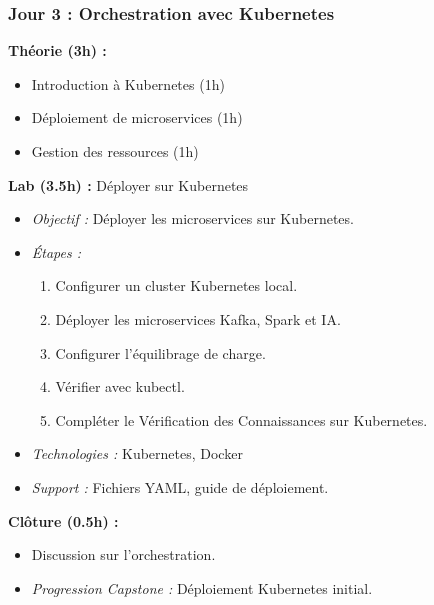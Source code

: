 \documentclass[11pt]{article}
\begin{document}
\subsubsection{Jour 3 : Orchestration avec Kubernetes}
\textbf{Théorie (3h) :}
\begin{itemize}
    \item Introduction à Kubernetes (1h)
    \item Déploiement de microservices (1h)
    \item Gestion des ressources (1h)
\end{itemize}
\textbf{Lab (3.5h) :} Déployer sur Kubernetes
\begin{itemize}
    \item \textit{Objectif :} Déployer les microservices sur Kubernetes.
    \item \textit{Étapes :}
        \begin{enumerate}
            \item Configurer un cluster Kubernetes local.
            \item Déployer les microservices Kafka, Spark et IA.
            \item Configurer l'équilibrage de charge.
            \item Vérifier avec kubectl.
            \item Compléter le Vérification des Connaissances sur Kubernetes.
        \end{enumerate}
    \item \textit{Technologies :} Kubernetes, Docker
    \item \textit{Support :} Fichiers YAML, guide de déploiement.
\end{itemize}
\textbf{Clôture (0.5h) :}
\begin{itemize}
    \item Discussion sur l'orchestration.
    \item \textit{Progression Capstone :} Déploiement Kubernetes initial.
\end{itemize}
\end{document}
